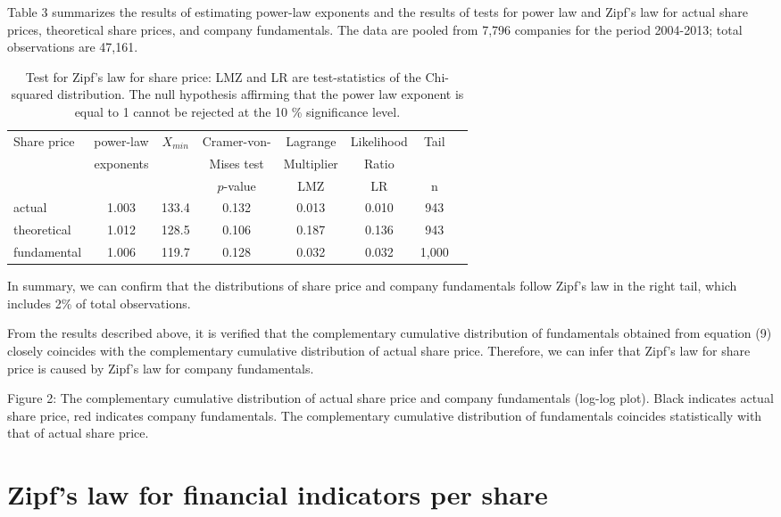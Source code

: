 \documentclass[10pt,a4paper]{article}
\begin{document}
Table 3 summarizes the results of estimating power-law exponents and the results of tests for power law and Zipf's law for actual share prices,   theoretical share prices, and company fundamentals. The data are pooled from 7,796 companies for the period 2004-2013; total observations are 47,161.

\begin{table}[H]
\begin{center}
\begin{tabular}{lccccccc} \hline
Share price &power-law & $X_{min}$ & Cramer-von-&  Lagrange &Likelihood & Tail\\
              & exponents   &    &  Mises test&  Multiplier& Ratio& \\ 
              &    &    & $p$-value &  LMZ &  LR & n  \\ \hline
actual  & 1.003 & 133.4 & 0.132 & 0.013 & 0.010 & 943 \\
theoretical  & 1.012 & 128.5 & 0.106 & 0.187 & 0.136 & 943 \\
fundamental&1.006 & 119.7 &0.128 & 0.032 & 0.032 & 1,000 \\ \hline
\end{tabular}
\end{center} 
\caption{Test for Zipf's law for share price: LMZ and LR are test-statistics of the Chi-squared distribution. The null hypothesis affirming that the power law exponent is equal to 1 cannot be rejected at the 10 \% significance level.}
\end{table}

In summary, we can confirm that the distributions of share price and company fundamentals follow Zipf's law in the right tail, which includes 2\% of total observations.

From the results described above, it is verified that the complementary cumulative distribution of fundamentals obtained from equation (9) closely coincides with the complementary cumulative distribution of actual share price. Therefore, we can infer that Zipf's law for share price is caused by Zipf's law for company fundamentals. 

Figure 2: The complementary cumulative distribution of actual share price and company fundamentals (log-log plot). Black indicates actual share price, red indicates company fundamentals. The complementary cumulative distribution of fundamentals coincides statistically with that of actual share price.

\section{Zipf's law for financial indicators per share}
\end{document}
